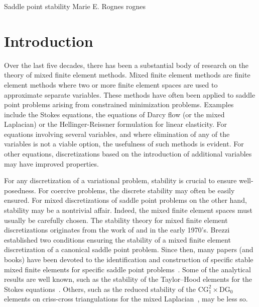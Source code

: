              {Saddle point stability}
              {Marie E. Rognes}
              {rognes}

\newcommand{\rognesc}{c}
\newcommand{\rognestriang}{\mathcal{T}}

\newcommand{\rognescg}{\mathrm{CG}}
\newcommand{\rognesrt}{\mathrm{RT}}
\newcommand{\rognesdg}{\mathrm{DG}}
\newcommand{\rognesascot}{ASCoT}
\newcommand{\rognespython}{python}

\section{Introduction}

Over the last five decades, there has been a substantial body of
research on the theory of mixed finite element methods.  Mixed finite
element methods are finite element methods where two or more finite
element spaces are used to approximate separate variables.  These
methods have often been applied to saddle point problems arising from
constrained minimization problems. Examples include the Stokes
equations, the equations of Darcy flow (or the mixed Laplacian) or the
Hellinger-Reissner formulation for linear elasticity.  For equations
involving several variables, and where elimination of any of the
variables is not a viable option, the usefulness of such methods is
evident. For other equations, discretizations based on the
introduction of additional variables may have improved properties.

For any discretization of a variational problem, stability is crucial
to ensure well-posedness. For coercive problems, the discrete
stability may often be easily ensured. For mixed discretizations of
saddle point problems on the other hand, stability may be a nontrivial
affair. Indeed, the mixed finite element spaces must usually be
carefully chosen. The stability theory for mixed finite element
discretizations originates from the work of \citet{Babuvska1972/73}
and \citet{Brezzi1974} in the early
1970's. Brezzi established two conditions ensuring the stability of a
mixed finite element discretization of a canonical saddle point
problem.  Since then, many papers (and books) have been devoted to the
identification and construction of specific stable mixed finite
elements for specific saddle point
problems~\citep{ArnoldFalkWinther2006, BrezziDouglasMarini1985,
  BrezziFalk1991, BrezziFortin1991, RaviartThomas1977,
  TaylorHood1973}. Some of the analytical results are well known, such
as the stability of the Taylor--Hood elements for the Stokes
equations~\citep{BrezziFalk1991, Stenberg1984, TaylorHood1973}.
Others, such as the reduced stability of the $\rognescg_1^2 \times
\rognesdg_0$ elements on criss-cross triangulations for the mixed
Laplacian~\citep{BoffiBrezziGastaldi2000}, may be less so.

